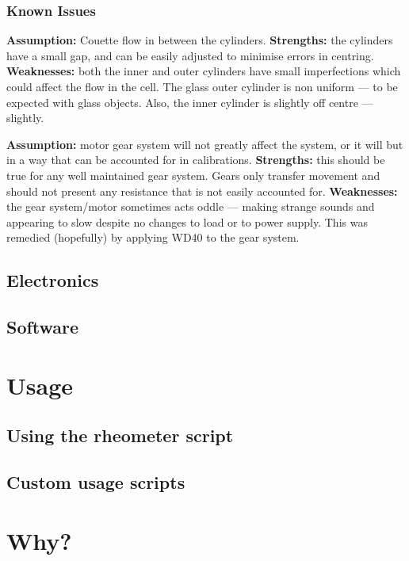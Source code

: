 \documentclass{report}
\begin{document}
			\subsection*{Known Issues}
				\textbf{Assumption:} Couette flow in between the cylinders. \textbf{Strengths:} the cylinders have a small gap, and can be easily adjusted to minimise errors in centring. \textbf{Weaknesses:} both the inner and outer cylinders have small imperfections which could affect the flow in the cell. The glass outer cylinder is non uniform --- to be expected with glass objects. Also, the inner cylinder is slightly off centre --- slightly.
				
				\textbf{Assumption:} motor gear system will not greatly affect the system, or it will but in a way that can be accounted for in calibrations. \textbf{Strengths:} this should be true for any well maintained gear system. Gears only transfer movement and should not present any resistance that is not easily accounted for. \textbf{Weaknesses:} the gear system/motor sometimes acts oddle --- making strange sounds and appearing to slow despite no changes to load or to power supply. This was remedied (hopefully) by applying WD40 to the gear system.
			
		\section{Electronics}
		
		\section{Software}
	
	\chapter{Usage}
	
		\section{Using the rheometer script}
		
		\section{Custom usage scripts}
	
	\chapter{}
	
	\chapter{Why?}

	
\end{document}
